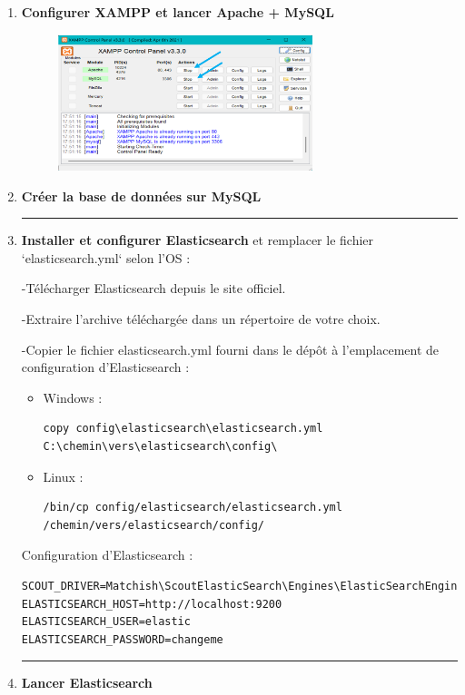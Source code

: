 \documentclass[12pt]{article}
\begin{document}
\begin{enumerate}
    \item \textbf{Configurer XAMPP et lancer Apache + MySQL}
        \begin{figure}[h!] 
            \centering 
            \includegraphics[width=0.7\textwidth]{./img/xampp.png} 
        \end{figure}
    \item \textbf{Créer la base de données sur MySQL}
    
\rule{\linewidth}{0.2pt}
    \item \textbf{Installer et configurer Elasticsearch} et remplacer le fichier `elasticsearch.yml` selon l'OS :

-Télécharger Elasticsearch depuis le site officiel.

-Extraire l'archive téléchargée dans un répertoire de votre choix.

-Copier le fichier elasticsearch.yml fourni dans le dépôt à l'emplacement de configuration d'Elasticsearch : 
        \begin{itemize}
            \item Windows :
            \begin{lstlisting}
copy config\elasticsearch\elasticsearch.yml C:\chemin\vers\elasticsearch\config\
            \end{lstlisting}
            \item Linux :
            \begin{lstlisting}
/bin/cp config/elasticsearch/elasticsearch.yml /chemin/vers/elasticsearch/config/
            \end{lstlisting}
        \end{itemize}
Configuration d'Elasticsearch :
    \begin{lstlisting}
SCOUT_DRIVER=Matchish\ScoutElasticSearch\Engines\ElasticSearchEngine
ELASTICSEARCH_HOST=http://localhost:9200
ELASTICSEARCH_USER=elastic
ELASTICSEARCH_PASSWORD=changeme
    \end{lstlisting}
\rule{\linewidth}{0.2pt}
    \item \textbf{Lancer Elasticsearch}


\end{enumerate}
\end{document}
